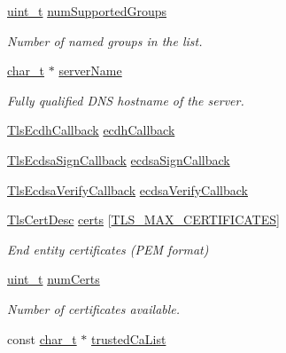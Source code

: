 \begin{DoxyCompactItemize}
\hyperlink{compiler__port_8h_a12a1e9b3ce141648783a82445d02b58d}{uint\+\_\+t} \hyperlink{struct__TlsContext_a9eacf4ea95aa4bf1964c3236abbba7d8}{num\+Supported\+Groups}
\begin{DoxyCompactList}\small\item\em Number of named groups in the list. \end{DoxyCompactList}\item 
\hyperlink{compiler__port_8h_a40bb5262bf908c328fbcfbe5d29d0201}{char\+\_\+t} $\ast$ \hyperlink{struct__TlsContext_a740513ffb7f2b2f0667ebcf6af1254eb}{server\+Name}
\begin{DoxyCompactList}\small\item\em Fully qualified D\+NS hostname of the server. \end{DoxyCompactList}\item 
\hyperlink{tls_8h_ad0cd644ab2e901c494d04e42bcc832d0}{Tls\+Ecdh\+Callback} \hyperlink{struct__TlsContext_a039661027042c4f566138c8b1a5f280b}{ecdh\+Callback}
\item 
\hyperlink{tls_8h_a6f737cb17e8452166e73c85b7d5a9256}{Tls\+Ecdsa\+Sign\+Callback} \hyperlink{struct__TlsContext_a8d7f175b8049e525133d306b0ea5c8c6}{ecdsa\+Sign\+Callback}
\item 
\hyperlink{tls_8h_a1d84397a61d8222779e78997e5fdfa53}{Tls\+Ecdsa\+Verify\+Callback} \hyperlink{struct__TlsContext_a857a8388d22d664d36aa857a9265ff04}{ecdsa\+Verify\+Callback}
\item 
\hyperlink{structTlsCertDesc}{Tls\+Cert\+Desc} \hyperlink{struct__TlsContext_a260ab9cc7c97883a4506db9fc0067aef}{certs} \mbox{[}\hyperlink{tls__config_8h_a23af217ea8d64e790e6e1e4bca07e2c5}{T\+L\+S\+\_\+\+M\+A\+X\+\_\+\+C\+E\+R\+T\+I\+F\+I\+C\+A\+T\+ES}\mbox{]}
\begin{DoxyCompactList}\small\item\em End entity certificates (P\+EM format) \end{DoxyCompactList}\item 
\hyperlink{compiler__port_8h_a12a1e9b3ce141648783a82445d02b58d}{uint\+\_\+t} \hyperlink{struct__TlsContext_adb4903f8e4775c48edfb89ede109eab3}{num\+Certs}
\begin{DoxyCompactList}\small\item\em Number of certificates available. \end{DoxyCompactList}\item 
const \hyperlink{compiler__port_8h_a40bb5262bf908c328fbcfbe5d29d0201}{char\+\_\+t} $\ast$ \hyperlink{struct__TlsContext_ace5d3291f2eed9b075ad55f624d81fb9}{trusted\+Ca\+List}

\end{DoxyCompactItemize}
